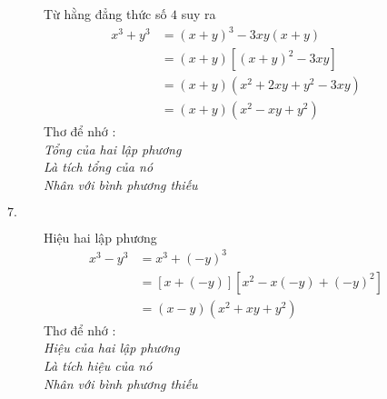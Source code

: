 \documentclass[14pt,twoside,a4paper, openany]{book}
\theoremstyle{definition}
\theoremstyle{plain}
\begin{document}
\begin{description}
\begin{description}
Từ hằng đẳng thức số $4$ suy ra
\begin{equation*}
\begin{split}
x^3+y^3&=(x+y)^3-3xy(x+y)\\
  &=(x+y)[(x+y)^2-3xy]\\
&=(x+y)(x^2+2xy+y^2-3xy)\\
&=(x+y)(x^2-xy+y^2)
\end{split}
\end{equation*}
Thơ để nhớ :\\
\emph{Tổng của hai lập phương\\
Là tích tổng của nó\\
Nhân với bình phương thiếu\\}
\item[$7.$] Hiệu hai lập phương
\begin{equation*}
\begin{split}
x^3-y^3&=x^3+(-y)^3\\
             &=[x+(-y)][x^2-x(-y)+(-y)^2]\\
             &=(x-y)(x^2+xy+y^2)
\end{split}
\end{equation*}
Thơ để nhớ :\\
\emph{Hiệu của hai lập phương\\
Là tích hiệu của nó\\
Nhân với bình phương thiếu\\}
\end{description}

\end{description}
\end{document}
